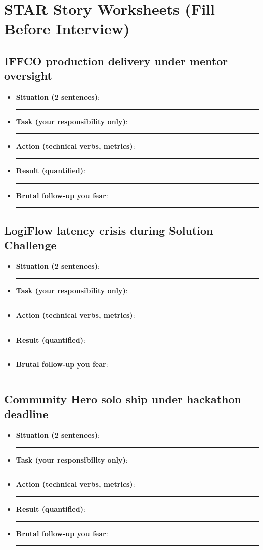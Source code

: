 \documentclass[9pt,a4paper]{article}
\begin{document}
\section{STAR Story Worksheets (Fill Before Interview)}
\subsection{IFFCO production delivery under mentor oversight}
\begin{itemize}
  \item \textbf{Situation (2 sentences)}: \rule{0.65\textwidth}{0.4pt}
  \item \textbf{Task (your responsibility only)}: \rule{0.65\textwidth}{0.4pt}
  \item \textbf{Action (technical verbs, metrics)}: \rule{0.65\textwidth}{0.4pt}
  \item \textbf{Result (quantified)}: \rule{0.65\textwidth}{0.4pt}
  \item \textbf{Brutal follow-up you fear}: \rule{0.65\textwidth}{0.4pt}
\end{itemize}
\subsection{LogiFlow latency crisis during Solution Challenge}
\begin{itemize}
  \item \textbf{Situation (2 sentences)}: \rule{0.65\textwidth}{0.4pt}
  \item \textbf{Task (your responsibility only)}: \rule{0.65\textwidth}{0.4pt}
  \item \textbf{Action (technical verbs, metrics)}: \rule{0.65\textwidth}{0.4pt}
  \item \textbf{Result (quantified)}: \rule{0.65\textwidth}{0.4pt}
  \item \textbf{Brutal follow-up you fear}: \rule{0.65\textwidth}{0.4pt}
\end{itemize}
\subsection{Community Hero solo ship under hackathon deadline}
\begin{itemize}
  \item \textbf{Situation (2 sentences)}: \rule{0.65\textwidth}{0.4pt}
  \item \textbf{Task (your responsibility only)}: \rule{0.65\textwidth}{0.4pt}
  \item \textbf{Action (technical verbs, metrics)}: \rule{0.65\textwidth}{0.4pt}
  \item \textbf{Result (quantified)}: \rule{0.65\textwidth}{0.4pt}
  \item \textbf{Brutal follow-up you fear}: \rule{0.65\textwidth}{0.4pt}
\end{itemize}
\end{document}
